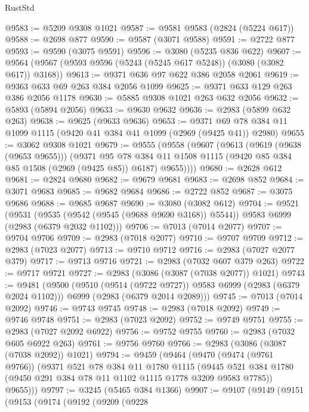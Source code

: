 \begin{lexlean}{RustStd}
\begin{coremodule}
@9583 := @5209 @9308 @1021
@9587 := @9581 @9583 (@2824 (@5224 @617))
@9588 := @2698 @877
@9590 := @9587 (@3071 @9588)
@9591 := @2722 @877
@9593 := @9590 (@3075 @9591)
@9596 := @3080 (@5235 @836 @622)
@9607 := @9564 (@9567 (@9593 @9596 (@5243 (@5245 @617 @5248)) (@3080 (@3082 @617)) @3168))
@9613 := @9371 @636 @97 @622 @386 @2058 @2061
@9619 := @9363 @633 @69 @263 @384 @2056 @1099
@9625 := @9371 @633 @129 @263 @386 @2056 @1178
@9630 := @5885 @9308 @1021 @263 @632 @2056
@9632 := @5893 (@5894 @2056)
@9633 := @9630 @9632
@9636 := @2983 (@5899 @632 @263)
@9638 := @9625 (@9633 @9636)
@9653 := @9371 @69 @78 @384 @11 @1099 @1115 (@9420 @41 @384 @41 @1099 (@2969 (@9425 @41)) @2980)
@9655 := @3062 @9308 @1021
@9679 := @9555
    (@9558
      (@9607
        (@9613
          (@9619 (@9638 (@9653 @9655)))
          (@9371
            @95
            @78
            @384
            @11
            @1508
            @1115
            (@9420 @85 @384 @85 @1508 (@2969 (@9425 @85)) @6187)
            @9655))))
@9680 := @2628 @612
@9681 := @2824 @9680
@9682 := @9679 @9681
@9683 := @2698 @852
@9684 := @3071 @9683
@9685 := @9682 @9684
@9686 := @2722 @852
@9687 := @3075 @9686
@9688 := @9685 @9687
@9690 := @3080 (@3082 @612)
@9704 := @9521
    (@9531
      (@9535 (@9542 (@9545 (@9688 @9690 @3168)) @5544))
      @9583
      @6999
      (@2983 (@6379 @2032 @1102)))
@9706 := @7013 (@7014 @2077)
@9707 := @9704 @9706
@9709 := @2983 (@7018 @2077)
@9710 := @9707 @9709
@9712 := @2983 (@7023 @2077)
@9713 := @9710 @9712
@9716 := @2983 (@7027 @2077 @379)
@9717 := @9713 @9716
@9721 := @2983 (@7032 @607 @379 @263)
@9722 := @9717 @9721
@9727 := @2983 (@3086 (@3087 (@7038 @2077)) @1021)
@9743 := @9481
    (@9500
      (@9510 (@9514 (@9722 @9727)) @9583 @6999 (@2983 (@6379 @2024 @1102)))
      @6999
      (@2983 (@6379 @2014 @2089)))
@9745 := @7013 (@7014 @2092)
@9746 := @9743 @9745
@9748 := @2983 (@7018 @2092)
@9749 := @9746 @9748
@9751 := @2983 (@7023 @2092)
@9752 := @9749 @9751
@9755 := @2983 (@7027 @2092 @6922)
@9756 := @9752 @9755
@9760 := @2983 (@7032 @605 @6922 @263)
@9761 := @9756 @9760
@9766 := @2983 (@3086 (@3087 (@7038 @2092)) @1021)
@9794 := @9459
    (@9464
      (@9470
        (@9474 (@9761 @9766))
        (@9371
          @521
          @78
          @384
          @11
          @1780
          @1115
          (@9445 @521 @384 @1780 (@9450 @291 @384 @78 @11 @1102 @1115 @1778 @3209 @9583 @7785))
          @9655)))
@9797 := @3245 (@5465 @384 @1366)
@9907 := @9107
    (@9149
      (@9151
        (@9153
          (@9174
            (@9192
              (@9209
                (@9228

\end{coremodule}
\end{lexlean}
